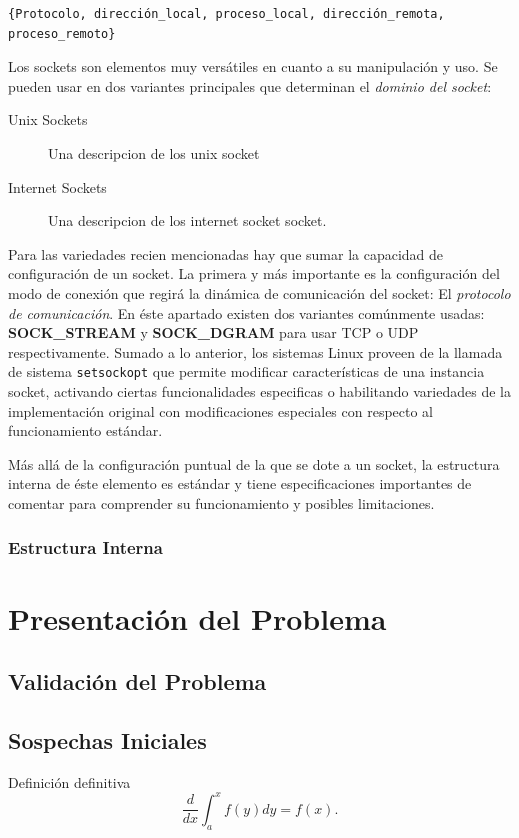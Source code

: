 \begin{verbatim}
{Protocolo, dirección_local, proceso_local, dirección_remota, proceso_remoto}
\end{verbatim}

Los sockets son elementos muy versátiles en cuanto a su manipulación y uso. Se pueden usar en dos variantes principales que determinan el \emph{dominio del socket}:
\begin{description}
\item[Unix Sockets] Una descripcion de los unix socket
\item[Internet Sockets] Una descripcion de los internet socket socket.
\end{description}

Para las variedades recien mencionadas hay que sumar la capacidad de configuración de un socket. La primera y más importante es la configuración del modo de conexión que regirá la dinámica de comunicación del socket: El \emph{protocolo de comunicación}. En éste apartado existen dos variantes comúnmente usadas: \textbf{SOCK\_STREAM} y \textbf{SOCK\_DGRAM} para usar TCP o UDP respectivamente. Sumado a lo anterior, los sistemas Linux proveen de la llamada de sistema \verb=setsockopt= que permite modificar características de una instancia socket, activando ciertas funcionalidades especificas o habilitando variedades de la implementación original con modificaciones especiales con respecto al funcionamiento estándar.

Más allá de la configuración puntual de la que se dote a un socket, la estructura interna de éste elemento es estándar y tiene especificaciones importantes de comentar para comprender su funcionamiento y posibles limitaciones.

\subsubsection{Estructura Interna}

\section{Presentación del Problema}

\subsection{Validación del Problema}

\subsection{Sospechas Iniciales}

\begin{defn} Definición definitiva $$\frac{d}{dx}\int_a^xf(y)dy=f(x).$$\end{defn}